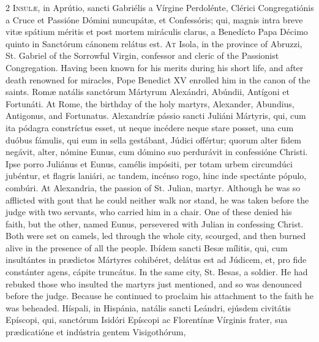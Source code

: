 \begin{paracol}{2}
\lettrine[lines=2]{I}{nsulæ,} in Aprútio, sancti Gabriélis a Vírgine 
 Perdolénte, Clérici Congregatiónis a Cruce et Passióne Dómini nuncupátæ, et 
 Confessóris; qui, magnis intra breve vitæ spátium méritis et post mortem 
 miráculis clarus, a Benedícto Papa Décimo quinto in Sanctórum cánonem 
 relátus est.
\switchcolumn
{}
\lettrine[lines=2]{A}{t} Isola, in the province of Abruzzi, St. Gabriel of the Sorrowful Virgin, 
 confessor and cleric of the Passionist Congregation. Having been known 
 for his merits during his short life, and after death renowned for miracles, 
 Pope Benedict XV enrolled him in the canon of the saints.
\switchcolumn*
{}
Romæ natális sanctórum Mártyrum Alexándri, 
 Abúndii, Antígoni et Fortunáti.
\switchcolumn
{}
At Rome, the birthday of the holy martyrs, Alexander, Abundius, Antigonus, 
 and Fortunatus.
\switchcolumn*
{}
Alexandríæ pássio sancti Juliáni Mártyris, qui, 
 cum ita pódagra constríctus esset, ut neque incédere neque stare posset, una 
 cum duóbus fámulis, qui eum in sella gestábant, Júdici offértur; quorum 
 alter fidem negávit, alter, nómine Eunus, cum dómino suo perdurávit in 
 confessióne Christi. Ipse porro Juliánus et Eunus, camélis impósiti, 
 per totam urbem circumdúci jubéntur, et flagris laniári, ac tandem, incénso 
 rogo, hinc inde spectánte pópulo, combúri.
\switchcolumn
{}
At Alexandria, the passion of St. Julian, martyr. Although he was so 
 afflicted with gout that he could neither walk nor stand, he was taken 
 before the judge with two servants, who carried him in a chair. One of 
 these denied his faith, but the other, named Eunus, persevered with Julian 
 in confessing Christ. Both were set on camels, led through the whole 
 city, scourged, and then burned alive in the presence of all the people.
\switchcolumn*
{}
Ibídem sancti Besæ mílitis, qui, cum 
 insultántes in prædictos Mártyres cohibéret, delátus est ad Júdicem, et, pro 
 fide constánter agens, cápite truncátus.
\switchcolumn
{}
In the same city, St. Besas, a soldier. He had rebuked those who 
 insulted the martyrs just mentioned, and so was denounced before the judge. 
 Because he continued to proclaim his attachment to the faith he was 
 beheaded.
\switchcolumn*
{}
Híspali, in Hispánia, natális sancti Leándri, 
 ejúsdem civitátis Epíscopi, qui, sanctórum Isidóri Epíscopi ac Florentínæ 
 Vírginis frater, sua prædicatióne et indústria gentem Visigothórum, 

\end{paracol}
